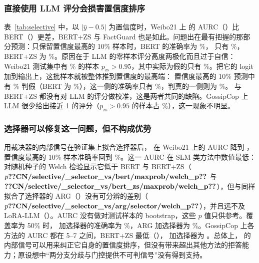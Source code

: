\subsubsection{直接使用 LLM 评分会损害置信度排序}
表~\ref{tab:selective} 中，以 $|\hat y-0.5|$ 为置信度时，Weibo21 上 \method{} 的 AURC（）比 BERT（）更差，BERT+ZS 与 FactGuard 也是如此。问题出在最有把握的那部分预测：只保留置信度最高的 10\% 样本时，BERT 的准确率为 \%，\method{} 只有 \%，BERT+ZS 为 \%。原因在于 LLM 的零样本评分高度两极化而且过于自信：Weibo21 测试集中有 \% 的样本 $p_{\mathrm{zs}}>0.95$，其中实际为假的只有 \%。把它的 logit 加到输出上，这批样本就被整体推到置信度的最高端：\method{} 置信度最高的 10\% 预测中有 \% 判假（BERT 为 \%），这一侧的准确率只有 \%，判真的一侧则为 \%。\method{} 与 BERT+ZS 都没有对 LLM 的评分做校准，这是两者共同的缺陷。GossipCop 上 LLM 很少给出接近 1 的评分（$p_{\mathrm{zs}}>0.95$ 的样本占 \%），这一现象不明显。

\subsubsection{选择器可以修复这一问题，但不构成优势}
用裁决器的内部信号在验证集上拟合选择器后，\method{} 在 Weibo21 上的 AURC 降到 ，置信度最高的 10\% 样本准确率回到 \%。这一 AURC 在 SLM 类方法中数值最低：对随机种子的 Welch 检验显示它低于 BERT 与 BERT+ZS（$p\peq{CN/selective/_selector_vs/bert/maxprob/welch_p}$ 与 $\fthree{CN/selective/_selector_vs/bert_zs/maxprob/welch_p}$），但与同样拟合了选择器的 ARG（）没有可分辨的差别（$p\peq{CN/selective/_selector_vs/arg/selector/welch_p}$），并且远不及 LoRA-LLM（）。AURC 没有做对测试样本的 bootstrap，这些 $p$ 值只供参考。覆盖率为 50\% 时，\method{} 加选择器的准确率为 \%，ARG 加选择器为 \%。GossipCop 上各方法的 AURC 都在 5--7 之间，BERT+ZS 最低（），\method{} 加选择器为 。总体上，\method{} 的内部信号可以用来纠正它自身的置信度排序，但没有带来超出其他方法的拒答能力；原设想中“两分支分歧与门控提供不可判信号”没有得到支持。

